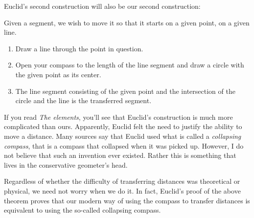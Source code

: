 \documentclass{ximera}
\begin{document}
Euclid's second construction will also be our second construction:

\begin{construction}
Given a segment, we wish to move it so that it starts on a given
point, on a given line.
\begin{enumerate}        
\item Draw a line through the point in question.
\item Open your compass to the length of the line segment and draw a circle with the given point as its center.
\item The line segment consisting of the given point and the intersection of the circle and the line 
is the transferred segment.
\end{enumerate}
\end{construction}



If you read \textit{The elements}, you'll see that Euclid's
construction is much more complicated than ours.  Apparently, Euclid
felt the need to justify the ability to move a distance. Many sources
say that Euclid used what is called a \textit{collapsing compass}, that is a compass that
collapsed when it was picked up. However, I do not believe that such
an invention ever existed. Rather this is something that lives in the
conservative geometer's head.


Regardless of whether the difficulty of transferring distances was theoretical
or physical, we need not worry when we do it.  In fact, Euclid's
proof of the above theorem proves that our modern way of using the
compass to transfer distances is equivalent to using the so-called
collapsing compass.
\end{document}
